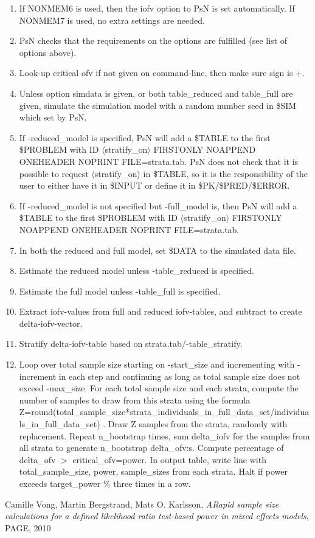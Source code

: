 \begin{enumerate}
\item If NONMEM6 is used, then the iofv option to PsN is set automatically. If NONMEM7 is used, no extra settings are needed.
\item PsN checks that the requirements on the options are fulfilled (see list of options above).
\item Look-up critical ofv if not given on command-line, then make sure sign is +.
\item Unless option simdata is given, or both table\_reduced and table\_full are given, simulate the simulation model with a random number seed in \$SIM which set by PsN.
\item If -reduced\_model is specified, PsN will add a \$TABLE to the first \$PROBLEM with ID $\langle$stratify\_on$\rangle$ FIRSTONLY NOAPPEND ONEHEADER NOPRINT FILE=strata.tab. PsN does not check that it is possible to request $\langle$stratify\_on$\rangle$ in \$TABLE, so it is the responsibility of the user to either have it in \$INPUT or define it in \$PK/\$PRED/\$ERROR.
\item If -reduced\_model is not specified but -full\_model is, then  PsN will add a \$TABLE to the first \$PROBLEM with ID $\langle$stratify\_on$\rangle$ FIRSTONLY NOAPPEND ONEHEADER NOPRINT FILE=strata.tab.
\item In both the reduced and full model, set \$DATA to the simulated data file.
\item Estimate the reduced model unless -table\_reduced is specified.
\item Estimate the full model unless -table\_full is specified.
\item Extract iofv-values from full and reduced iofv-tables, and subtract to create delta-iofv-vector.
\item Stratify delta-iofv-table based on strata.tab/-table\_stratify.
\item Loop over total sample size starting on -start\_size and incrementing with -increment in each step and continuing as long as total sample size does not exceed -max\_size. For each total sample size and each strata, compute the number of samples to draw from this strata using the formula Z=round(total\_sample\_size*strata\_individuals\_in\_full\_data\_set/individuals\_in\_full\_data\_set) . Draw Z samples from the strata, randomly with replacement. Repeat n\_bootstrap times, sum delta\_iofv for the samples from all strata to generate n\_bootstrap delta\_ofv:s. Compute percentage of delta\_ofv $>$ critical\_ofv=power. In output table, write line with total\_sample\_size, power, sample\_sizes from each strata. Halt if power exceeds target\_power \% three times in a row.
\end{enumerate}

\begin{thebibliography}{1}
 Camille Vong, Martin Bergstrand, Mats O. Karlsson, {\em ARapid sample size calculations for a defined likelihood ratio test-based power in mixed effects models}, PAGE, 2010
\end{thebibliography}



